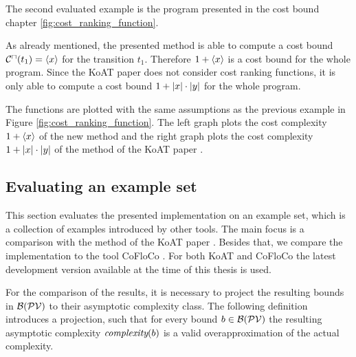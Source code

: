 \iffalse

\fi

The second evaluated example is the program presented in the cost bound chapter \ref{fig:cost_ranking_function}.



As already mentioned, the presented method is able to compute a cost bound ${\mathcal{C}^\sqcap}(t_1) = \langle x\rangle$ for the transition $t_1$.
Therefore $1 + \langle x\rangle$ is a cost bound for the whole program.
Since the KoAT paper \cite{koat} does not consider cost ranking functions, it is only able to compute a cost bound $1 + \left|x\right| \cdot \left|y\right|$ for the whole program.

The functions are plotted with the same assumptions as the previous example in Figure \ref{fig:cost_ranking_function}.
The left graph plots the cost complexity $1 + \langle x\rangle$ of the new method and the right graph plots the cost complexity $1 + \left|x\right| \cdot \left|y\right|$ of the method of the KoAT paper \cite{koat}.

\iffalse

\fi

\subsection{Evaluating an example set}

This section evaluates the presented implementation on an example set, which is a collection of examples introduced by other tools.
The main focus is a comparison with the method of the KoAT paper \cite{koat}.
Besides that, we compare the implementation to the tool CoFloCo \cite{cofloco3}.
For both KoAT and CoFloCo the latest development version available at the time of this thesis is used.

For the comparison of the results, it is necessary to project the resulting bounds in $\mathcal{B}(\mathcal{PV})$ to their asymptotic complexity class.
The following definition introduces a projection, such that for every bound $b \in \mathcal{B}(\mathcal{PV})$ the resulting asymptotic complexity $\emph{complexity}(b)$ is a valid overapproximation of the actual complexity.

